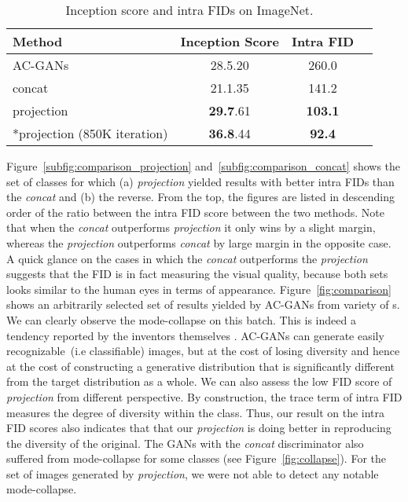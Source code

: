 \documentclass{article}
\begin{document}
\begin{table}[t]
\centering
\caption{Inception score and intra FIDs on
 ImageNet.}
 \label{tab:scores_imagenet}
    \begin{tabular}[t]{lccc}
        \toprule
        Method & Inception Score  & Intra FID \\
        \midrule
        AC-GANs & 28.5.20 & 260.0 \\
        concat & 21.1.35 & 141.2\\
        projection &\textbf{29.7}.61 & \textbf{103.1}\\
        \midrule
        *projection (850K iteration) & \textbf{36.8}.44 & \textbf{92.4}\\
        \bottomrule
    \end{tabular}
\end{table}
Figure~\ref{subfig:comparison_projection} and~\ref{subfig:comparison_concat} shows the set of classes for which (a) \textit{projection} yielded results with better intra FIDs than the \textit{concat} and (b) the reverse.  
From the top, the figures are listed in descending order of the ratio between the intra FID score between the two methods.  
Note that when the \textit{concat} outperforms \textit{projection} it only wins by a slight margin, whereas the \textit{projection} outperforms \textit{concat} by large margin in the opposite case. 
A quick glance on the cases in which the \textit{concat} outperforms the \textit{projection} suggests that the FID is in fact measuring the visual quality, because both sets looks similar to the human eyes in terms of appearance.
Figure~\ref{fig:comparison} shows an arbitrarily selected set of results yielded by AC-GANs from variety of s.  
We can clearly observe the mode-collapse on this batch.  
This is indeed a tendency reported by the inventors themselves \cite[]{odena2016conditional}.  
AC-GANs can generate easily recognizable~(i.e classifiable) images, but at the cost of losing diversity and hence at the cost of constructing a generative distribution that is significantly different from the target distribution as a whole.
We can also assess the low FID score of \textit{projection} from different perspective. 
By construction, the trace term of intra FID measures the degree of diversity within the class. 
Thus, our result on the intra FID scores also indicates that that our \textit{projection} is doing better in reproducing the diversity of the original. The GANs with the \textit{concat} discriminator also suffered from mode-collapse for some classes (see Figure~\ref{fig:collapse}).
For the set of images generated by \textit{projection}, we were not able to detect any notable mode-collapse. 
\end{document}
